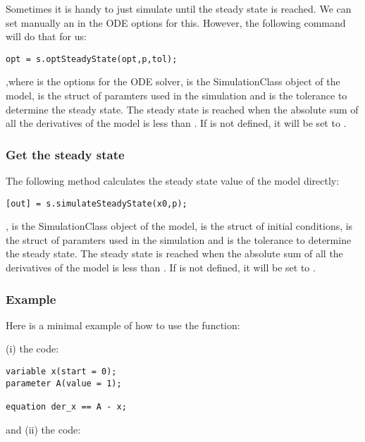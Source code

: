 \documentclass[11pt]{article}
\begin{document}
Sometimes it is handy to just simulate until the steady state is reached. We can set manually an  in the ODE options for this. However, the following command will do that for us:

\begin{lstlisting}
opt = s.optSteadyState(opt,p,tol);
\end{lstlisting}

,where  is the options for the ODE solver,  is the SimulationClass object of the model,  is the struct of paramters used in the simulation and  is the tolerance to determine the steady state. The steady state is reached when the absolute sum of all the derivatives of the model is less than . If  is not defined, it will be set to .

\subsubsection{Get the steady state}

The following method calculates the steady state value of the model directly:

\begin{lstlisting}
[out] = s.simulateSteadyState(x0,p);
\end{lstlisting}

,  is the SimulationClass object of the model,  is the struct of initial conditions,  is the struct of paramters used in the simulation and  is the tolerance to determine the steady state. The steady state is reached when the absolute sum of all the derivatives of the model is less than . If  is not defined, it will be set to .

\subsubsection{Example}

Here is a minimal example of how to use the  function:

(i) the  code:

\begin{lstlisting}
variable x(start = 0); 
parameter A(value = 1);

equation der_x == A - x;
\end{lstlisting}

and (ii) the  code:
\end{document}
